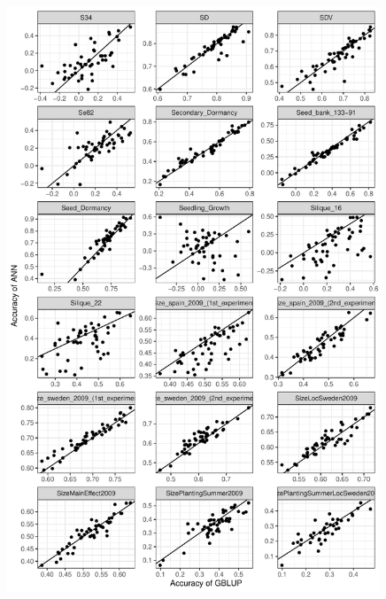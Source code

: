 \begin{figure}[H]
  \centering \includegraphics[height=0.99\textheight, width=0.99\textwidth]{Figures/gray_cor_plots_6}
  \decoRule
 \label{fig:bla}
\end{figure}

